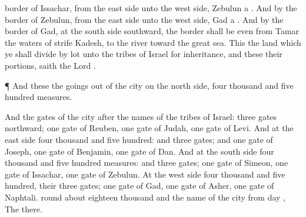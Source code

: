 {border of
Issachar, from the
east
side unto the
west
side,
Zebulun
a
{}.
And by the
border of
Zebulun, from the
east
side unto the
west
side,
Gad
a
{}.
And by the
border of
Gad, at the
south
side
southward, the
border shall be even from
Tamar
{} the
waters of
strife
{}
Kadesh,
{} to the
river toward the
great
sea.
This
{} the
land which ye shall
divide by lot unto the
tribes of
Israel for
inheritance, and these
{} their
portions,
saith the
Lord
{}.
\par }{\PP {}¶ And these
{} the goings
out of the
city on the
north
side,
four
thousand and
five
hundred
measures.
\par }{\PP {}And the
gates of the
city
{} after the
names of the
tribes of
Israel:
three
gates
northward;
one
gate of
Reuben,
one
gate of
Judah,
one
gate of
Levi.
And at the
east
side
four
thousand and
five
hundred: and
three
gates; and
one
gate of
Joseph,
one
gate of
Benjamin,
one
gate of
Dan.
And at the
south
side
four
thousand and
five
hundred
measures: and
three
gates;
one
gate of
Simeon,
one
gate of
Issachar,
one
gate of
Zebulun.
At the
west
side
four
thousand and
five
hundred,
{} their
three
gates;
one
gate of
Gad,
one
gate of
Asher,
one
gate of
Naphtali.
 round
about
eighteen
thousand
{} and the
name of the
city from
{}
day
{}, The
{}
{}
there.
\par }